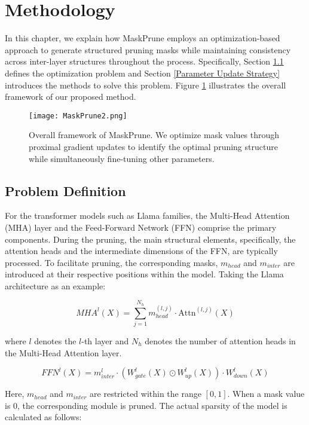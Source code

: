 \section{Methodology}
In this chapter, we explain how MaskPrune employs an optimization-based approach to generate structured pruning masks while maintaining consistency across inter-layer structures throughout the process. Specifically, Section \ref{Problem Definition} defines the optimization problem and Section \ref{Parameter Update Strategy} introduces the methods to solve this problem. Figure \ref{fig:MaskPrune2} illustrates the overall framework of our proposed method.

\begin{figure}
    \centering
    \texttt{[image: MaskPrune2.png]}
    \caption{Overall framework of MaskPrune. We optimize mask values through proximal gradient updates to identify the optimal pruning structure while simultaneously fine-tuning other parameters.}
    \label{fig:MaskPrune2}
\end{figure}

\subsection{Problem Definition} \label{Problem Definition}

For the transformer models such as Llama families, the Multi-Head Attention (MHA) layer and the Feed-Forward Network (FFN) comprise the primary components. During the pruning, the main structural elements, specifically, the attention heads and the intermediate dimensions of the FFN, are typically processed. To facilitate pruning, the corresponding masks, $m_{head}$ and $m_{inter}$ are introduced at their respective positions within the model. Taking the Llama architecture as an example:

\begin{equation*}
MHA^{l}(X) = \sum_{j=1}^{N_{h}} m_{head}^{(l, j)} \cdot \text{Attn}^{(l, j)}(X)
\end{equation*}

where \( l \) denotes the \( l \)-th layer and \( N_h \) denotes the number of attention heads in the Multi-Head Attention layer.

{\small
\begin{equation*}
FFN^{l}(X) = m^l_{inter} \cdot \left( W^l_{gate}(X) \odot W^l_{up}(X) \right) \cdot W^l_{down}(X)
\end{equation*}
}


Here, $m_{head}$ and $m_{inter}$ are restricted within the range $[0,1]$. When a mask value is 0, the corresponding module is pruned. The actual sparsity of the model is calculated as follows:

